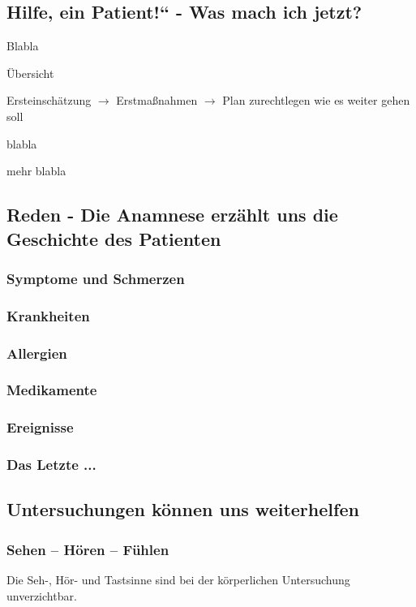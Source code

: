 \subsection{{\quotedblbase}Hilfe, ein Patient!{\textquotedblleft} - Was
mach{\textquotesingle} ich jetzt?}
Blabla

\"Ubersicht 

Ersteinsch\"atzung ${\rightarrow}$  Erstma{\ss}nahmen ${\rightarrow}$ 
Plan zurechtlegen wie es weiter gehen soll

blabla

mehr blabla

\subsection{Reden - Die Anamnese erz\"ahlt uns die
Geschichte des Patienten}


\subsubsection{Symptome und Schmerzen}
\subsubsection{Krankheiten}



\subsubsection{Allergien}
\subsubsection{Medikamente}
\subsubsection{Ereignisse}
\subsubsection{Das Letzte ...}

\subsection{Untersuchungen k\"onnen uns weiterhelfen}

\subsubsection{Sehen -- H\"oren -- F\"uhlen }
Die Seh-, Hör- und Tastsinne sind bei der körperlichen
Untersuchung unverzichtbar. 

